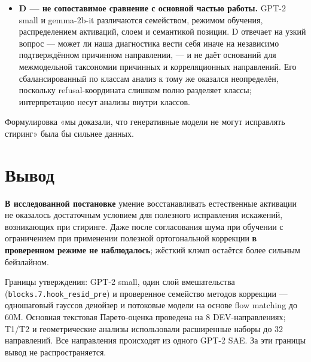 \documentclass[10pt,a4paper]{article}
\begin{document}
\begin{itemize}
    нелинейность не предсказывала результат B при равной реально достигнутой силе
    концепта после контроля проецируемой дисперсии ($\beta_1 = -0.027$,
    доверительный интервал включает ноль). Кроме того, ковариационно
    согласованный нулл построить не удалось: случайные единичные направления в
    768 измерениях не достигают проецируемой дисперсии концептных, поэтому
    сравнение «концептные против согласованных случайных» не интерпретируется, и
    работают только два контроля, согласованные по дисперсии по построению.
  \item \textbf{D — не сопоставимое сравнение с основной частью работы.} GPT-2
    small и gemma-2b-it различаются семейством, режимом обучения, распределением
    активаций, слоем и семантикой позиции. D отвечает на узкий вопрос — может ли
    наша диагностика вести себя иначе на независимо подтверждённом причинном
    направлении, — и не даёт оснований для межмодельной таксономии причинных и
    корреляционных направлений. Его сбалансированный по классам анализ к тому же
    оказался неопределён, поскольку refusal-координата слишком полно разделяет
    классы; интерпретацию несут анализы внутри классов.
\end{itemize}

Формулировка «мы доказали, что генеративные модели не могут исправлять стиринг»
была бы сильнее данных.

\section{Вывод}\label{sec:conclusion}

\begin{tcolorbox}[colback=white,colframe=accent,boxrule=0.9pt,arc=1pt,
                  left=10pt,right=10pt,top=8pt,bottom=8pt]
\textbf{В исследованной постановке} умение восстанавливать естественные
активации не оказалось достаточным условием для полезного исправления
искажений, возникающих при стиринге. Даже после согласования шума при обучении с ограничением при применении
полезной ортогональной коррекции \textbf{в проверенном режиме не
наблюдалось}; жёсткий клэмп остаётся более сильным бейзлайном.

\smallskip
{\small Границы утверждения: GPT-2 small, один слой вмешательства
(\texttt{blocks.7.hook\_resid\_pre}) и проверенное семейство методов коррекции —
одношаговый гауссов денойзер и потоковые модели на основе flow matching до 60M.
Основная текстовая Парето-оценка проведена на 8 DEV-направлениях; T1/T2 и
геометрические анализы использовали расширенные наборы до 32 направлений. Все
направления происходят из одного GPT-2 SAE. За эти границы вывод не
распространяется.}
\end{tcolorbox}
\end{document}
